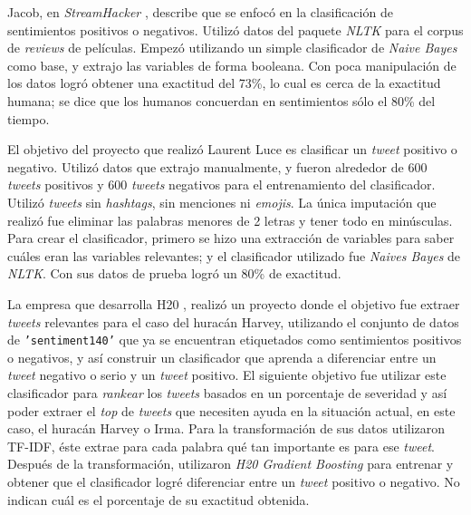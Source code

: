\documentclass[sigconf, nonacm, spanish]{acmart}
\begin{document}


Jacob, en \textit{StreamHacker} \cite{Jacob}, describe que se enfocó en la clasificación de sentimientos positivos o negativos. Utilizó datos del paquete \textit{NLTK} para el corpus de \textit{reviews} de películas. Empezó utilizando un simple clasificador de \textit{Naive Bayes} como base, y extrajo las variables de forma booleana. Con poca manipulación de los datos logró obtener una exactitud del 73\%, lo cual es cerca de la exactitud humana; se dice que los humanos concuerdan en sentimientos sólo el 80\% del tiempo.

El objetivo del proyecto que realizó Laurent Luce \cite{Laurent} es clasificar un \textit{tweet} positivo o negativo. Utilizó datos que extrajo manualmente, y fueron alrededor de 600 \textit{tweets} positivos y 600 \textit{tweets} negativos para el entrenamiento del clasificador. Utilizó \textit{tweets} sin \textit{hashtags}, sin menciones ni \textit{emojis}. La única imputación que realizó fue eliminar las palabras menores de 2 letras y tener todo en minúsculas. Para crear el clasificador, primero se hizo una extracción de variables para saber cuáles eran las variables relevantes; y el clasificador utilizado fue \textit{Naives Bayes} de \textit{NLTK}. Con sus datos de prueba logró un 80\% de exactitud.

La empresa que desarrolla H20 \cite{H20}, realizó un proyecto donde el objetivo fue extraer \textit{tweets} relevantes para el caso del huracán Harvey, utilizando el conjunto de datos de \texttt{'sentiment140'} que ya se encuentran etiquetados como sentimientos positivos o negativos, y así construir un clasificador que aprenda a diferenciar entre un \textit{tweet} negativo o serio y un \textit{tweet} positivo. El siguiente objetivo fue utilizar este clasificador para \textit{rankear} los \textit{tweets} basados en un porcentaje de severidad y así poder extraer el \textit{top} de \textit{tweets} que necesiten ayuda en la situación actual, en este caso, el huracán Harvey o Irma. Para la transformación de sus datos utilizaron TF-IDF, éste extrae para cada palabra qué tan importante es para ese \textit{tweet}. Después de la transformación, utilizaron \textit{H20 Gradient Boosting} para entrenar y obtener que el clasificador logré diferenciar entre un \textit{tweet} positivo o negativo. No indican cuál es el porcentaje de su exactitud obtenida.
\end{document}
